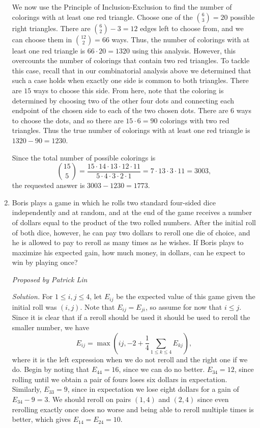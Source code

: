 \documentclass[10pt]{article}
\newcounter{enum}
\newcommand{\proposed}[1]
{
\vspace{5pt}
\noindent\textit{Proposed by #1}
}
\newcommand{\solution}
{
\vspace{5pt}
\noindent\textit{Solution.}\qquad
}
\begin{document}
\begin{enumerate}
\par We now use the Principle of Inclusion-Exclusion to find the number of colorings with at least one red triangle.  Choose one of the $\binom{6}{3} = 20$ possible right triangles.  There are $\binom{6}2 - 3 = 12$ edges left to choose from, and we can choose them in $\binom{12}2 = 66$ ways.  Thus, the number of colorings with at least one red triangle is $66\cdot 20 = 1320$ using this analysis.   However, this overcounts the number of colorings that contain two red triangles.  To tackle this case, recall that in our combinatorial analysis above we determined that such a case holds when exactly one side is common to both triangles.  There are $15$ ways to choose this side.  From here, note that the coloring is determined by choosing two of the other four dots and connecting each endpoint of the chosen side to each of the two chosen dots.  There are $6$ ways to choose the dots, and so there are $15\cdot 6 = 90$ colorings with two red triangles.  Thus the true number of colorings with at least one red triangle is $1320 - 90 = 1230$.

\par Since the total number of possible colorings is \[\binom{15}5 = \dfrac{15\cdot 14\cdot 13\cdot 12\cdot 11}{5\cdot 4\cdot 3\cdot 2\cdot 1} = 7\cdot 13\cdot 3 \cdot 11 = 3003,\] the requested answer is $3003 - 1230 = \boxed{1773}$.





\item Boris plays a game in which he rolls two standard four-sided dice independently and at random, and at the end of the game receives a number of dollars equal to the product of the two rolled numbers. After the initial roll of both dice, however, he can pay two dollars to reroll one die of choice, and he is allowed to pay to reroll as many times as he wishes. If Boris plays to maximize his expected gain, how much money, in dollars, can he expect to win by playing once?

\proposed{Patrick Lin}

\solution For $1 \le i,j \le 4$, let $E_{ij}$ be the expected value of this game given the initial roll was $(i,j)$. Note that $E_{ij} = E_{ji}$, so assume for now that $i \le j$. Since it is clear that if a reroll should be used it should be used to reroll the smaller number, we have
\[E_{ij} = \max\left(ij, -2 + \frac14 \sum_{1\le k\le 4} E_{kj}\right),\]
where it is the left expression when we do not reroll and the right one if we do.
Begin by noting that $E_{44} = 16$, since we can do no better. $E_{34} = 12$, since rolling until we obtain a pair of fours loses six dollars in expectation. Similarly, $E_{33} = 9$, since in expectation we lose eight dollars for a gain of $E_{34} - 9 = 3$. We should reroll on pairs $(1,4)$ and $(2,4)$ since even rerolling exactly once does no worse and being able to reroll multiple times is better, which gives $E_{14} = E_{24} = 10$.


\end{enumerate}
\end{document}
